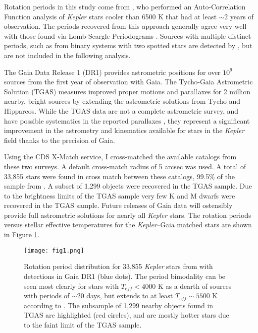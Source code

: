 \documentclass[manuscript, letterpaper]{aastex6}
\makeatletter
\let\origsection\section
\renewcommand\section{\@ifstar{\starsection}{\nostarsection}}
\newcommand\nostarsection[1]{\sectionprelude\origsection{#1}}
\newcommand\starsection[1]{\sectionprelude\origsection*{#1}}
\newcommand\sectionprelude{\vspace{1em}}
\newcommand{\Kepler}{\textsl{Kepler}\xspace}
\makeatother
\begin{document}
\section{The \Kepler--Gaia Data}
Rotation periods in this study come from \citet{mcquillan2014}, who performed an Auto-Correlation Function analysis of \Kepler stars cooler than 6500 K that had at least $\sim$2 years of observation. The periods recovered from this approach generally agree very well with those found via Lomb-Scargle Periodograms \citep[e.g.][]{reinhold2013,aigrain2015}. Sources with multiple distinct periods, such as from binary systems with two spotted stars \citep[e.g.][]{lurie2015} are detected by \citet{mcquillan2014}, but are not included in the following analysis.

The Gaia Data Release 1 (DR1) provides astrometric positions for over $10^9$ sources from the first year of observation with Gaia. The Tycho-Gaia Astrometric Solution (TGAS) measures improved proper motions and parallaxes for 2 million nearby, bright sources by extending the astrometric solutions from Tycho and Hipparcos. While the TGAS data are not a complete astrometric survey, and have possible systematics in the reported parallaxes \citep{stassun2016}, they represent a significant improvement in the astrometry and kinematics available for stars in the \Kepler field thanks to the precision of Gaia.


Using the CDS X-Match service, I cross-matched the available catalogs from these two surveys. A default cross-match radius of 5 arcsec was used. A total of 33,855 stars were found in cross match between these catalogs, 99.5\% of the sample from \citet{mcquillan2014}. 
A subset of 1,299 objects were recovered in the TGAS sample. Due to the brightness limits of the TGAS sample very few K and M dwarfs were recovered in the TGAS sample. Future releases of Gaia data will ostensibly provide full astrometric solutions for nearly all \Kepler stars. The rotation periods versus stellar effective temperatures for the \Kepler--Gaia matched stars are shown in Figure \ref{fig:all}. 



\begin{figure}[]
\centering
\texttt{[image: fig1.png]}
\caption{
Rotation period distribution for 33,855 \Kepler stars from \citet{mcquillan2014} with detections in Gaia DR1 (blue dots). The period bimodality can be seen most clearly for stars with $T_{eff} < 4000$ K as a dearth of sources with periods of $\sim$20 days, but extends to at least $T_{eff}\sim5500$ K according to \citet{mcquillan2014}. The subsample of 1,299 nearby objects found in TGAS are highlighted (red circles), and are mostly hotter stars due to the faint limit of the TGAS sample. 
}
\label{fig:all}
\end{figure}
\end{document}

